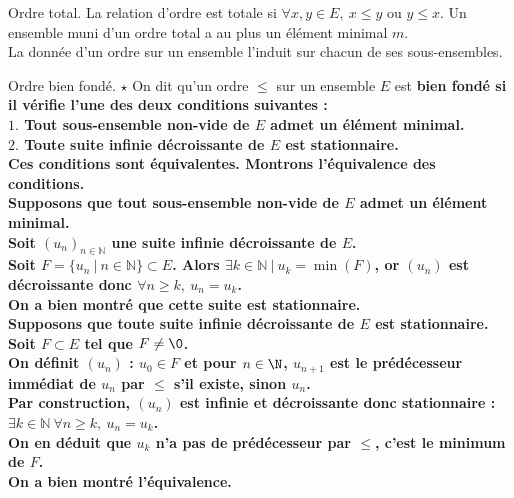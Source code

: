 \documentclass[french, 11pt]{article}
\begin{document}
\begin{defi}{Ordre total.}{}
    La relation d'ordre est totale si $\forall x,y\in E, ~ x\leq y$ ou $y \leq x$.\n
    Un ensemble muni d'un ordre total a au plus un élément minimal $m$.\\
    La donnée d'un ordre sur un ensemble l'induit sur chacun de ses sous-ensembles.
\end{defi}

\begin{defi}{Ordre bien fondé. $\star$}{}
    On dit qu'un ordre $\leq$ sur un ensemble $E$ est \bf{bien fondé} si il vérifie l'une des deux conditions suivantes :\\
    \hspace*{2em}$1.$ Tout sous-ensemble non-vide de $E$ admet un élément minimal.\\
    \hspace*{2em}$2.$ Toute suite infinie décroissante de $E$ est stationnaire.\\
    Ces conditions sont équivalentes.
    \tcblower
    Montrons l'équivalence des conditions.\\
    \fbox{$\ra$} Supposons que tout sous-ensemble non-vide de $E$ admet un élément minimal.\\
    Soit $(u_n)_{n\in\mathbb{N}}$ une suite infinie décroissante de $E$.\\
    Soit $F=\{u_n ~ | ~ n \in \mathbb{N}\}\subset E$. Alors $\exists k \in \mathbb{N} ~ | ~ u_k = \min(F)$, or $(u_n)$ est décroissante donc $\forall n \geq k, ~ u_n = u_k$.\\
    On a bien montré que cette suite est stationnaire.\\[0.2cm]
    \fbox{$\la$} Supposons que toute suite infinie décroissante de $E$ est stationnaire. Soit $F\subset E$ tel que $F \neq \0$.\\
    On définit $(u_n)$ : $u_0 \in F$ et pour $n\in\N$, $u_{n+1}$ est le prédécesseur immédiat de $u_n$ par $\leq$ s'il existe, sinon $u_n$.\\
    Par construction, $(u_n)$ est infinie et décroissante donc stationnaire : $\exists k \in \mathbb{N} ~ \forall n \geq k, ~ u_n = u_k$.\\
    On en déduit que $u_k$ n'a pas de prédécesseur par $\leq$, c'est le minimum de $F$.\\
    On a bien montré l'équivalence.
\end{defi}

\vspace*{-0.5cm}
\end{document}
